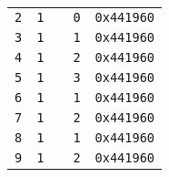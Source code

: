 \begin{adjustwidth}{5ex}{1ex}
\begin{tabular}{ccccc}
		\texttt{2} & \texttt{1} & & \texttt{0} & \texttt{0x441960} \\
		\texttt{3} & \texttt{1} & & \texttt{1} & \texttt{0x441960} \\
		\texttt{4} & \texttt{1} & & \texttt{2} & \texttt{0x441960} \\
		\texttt{5} & \texttt{1} & & \texttt{3} & \texttt{0x441960} \\
		\texttt{6} & \texttt{1} & & \texttt{1} & \texttt{0x441960} \\
		\texttt{7} & \texttt{1} & & \texttt{2} & \texttt{0x441960} \\
		\texttt{8} & \texttt{1} & & \texttt{1} & \texttt{0x441960} \\
		\texttt{9} & \texttt{1} & & \texttt{2} & \texttt{0x441960} \\
	\end{tabular}
\end{adjustwidth}
